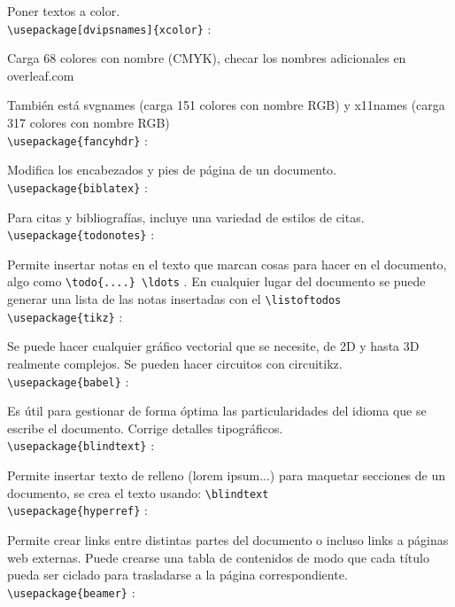 \documentclass[a4paper,12pt]{article}
\begin{document}
\begin{enumerate}
\begin{center}
    Poner textos a color.
    \vspace{0.5cm}\\ 
    \verb|\usepackage[dvipsnames]{xcolor}| : 

    Carga 68 colores con nombre (CMYK), checar los nombres adicionales en overleaf.com
    
    También está svgnames (carga 151 colores con nombre RGB) y x11names (carga 317 colores con nombre RGB)
    \vspace{0.5cm}\\
    \verb|\usepackage{fancyhdr}| :

    Modifica los encabezados y pies de página de un documento.
    \vspace{0.5cm}\\
    \verb|\usepackage{biblatex}| :

    Para citas y bibliografías, incluye una variedad de estilos de citas.
    \vspace{0.5cm}\\
    \verb|\usepackage{todonotes}| :

    Permite insertar notas en el texto que marcan cosas para hacer en el documento, algo como \verb|\todo{....} \ldots| . En cualquier lugar del documento se puede generar una lista de las notas insertadas con el \verb|\listoftodos|
    \vspace{0.5cm}\\
    \verb|\usepackage{tikz}| :

    Se puede hacer cualquier gráfico vectorial que se necesite, de 2D y hasta 3D realmente complejos. Se pueden hacer circuitos con circuitikz.
    \vspace{0.5cm}\\
    \verb|\usepackage{babel}| : 

    Es útil para gestionar de forma óptima las particularidades del idioma que se escribe el documento. Corrige detalles tipográficos.
    \vspace{0.5cm}\\
    \verb|\usepackage{blindtext}| :

    Permite insertar texto de relleno (lorem ipsum...) para maquetar secciones de un documento, se crea el texto usando: \verb|\blindtext|
    \vspace{0.5cm}\\
    \verb|\usepackage{hyperref}| :
    
    Permite crear links entre distintas partes del documento o incluso links a páginas web externas. Puede crearse una tabla de contenidos de modo que cada título pueda ser ciclado para trasladarse a la página correspondiente.
    \vspace{0.5cm}\\
    \verb|\usepackage{beamer}| :
    

\end{center}
\end{enumerate}
\end{document}
